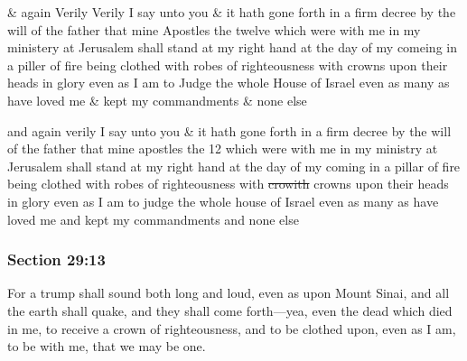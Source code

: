 		\begin{framed}
		\scriptsize
			\begin{compactdesc}
				\item[JSP] \& again Verily Verily I say unto you \& it hath gone forth in a firm decree by the will of the father that mine Apostles the twelve which were with me in my ministery at Jerusalem shall stand at my right hand at the day of my comeing in a piller of fire being clothed with robes of righteousness with crowns upon their heads in glory even as I am to Judge the whole House of Israel even as many as have loved me \& kept my commandments \& none else
				\item[HSN] and again verily I say unto you \& it hath gone forth in a firm decree by the will of the father that mine apostles the 12 which were with me in my ministry at Jerusalem shall stand at my right hand at the day of my coming in a pillar of fire being clothed with robes of righteousness with \sout{crowith} crowns upon their heads in glory even as I am to judge the whole house of Israel even as many as have loved me and kept my commandments and none else
			\end{compactdesc}
		\end{framed}

	\subsubsection{Section 29:13} %
		\label{DC29-13}

		For a trump shall sound both long and loud, even as upon Mount Sinai, and all the earth shall quake, and they shall come forth---yea, even the dead which died in me, to receive a crown of righteousness, and to be clothed upon, even as I am, to be with me, that we may be one.


